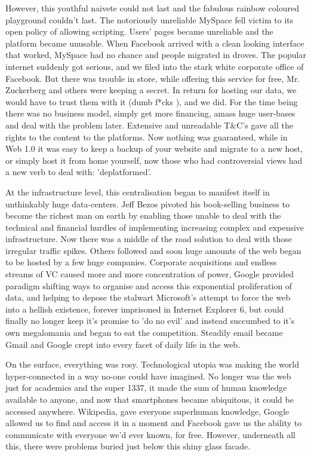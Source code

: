 However, this youthful naivete could not last and the fabulous rainbow coloured playground couldn't last. The notoriously unreliable MySpace fell victim to its open policy of allowing scripting. Users' pages became unreliable and the platform became unusable. When Facebook arrived with a clean looking interface that worked, MySpace had no chance and people migrated in droves. The popular internet suddenly got serious, and we filed into the stark white corporate office of Facebook. But there was trouble in store, while offering this service for free, Mr. Zuckerberg and others were keeping a secret. In return for hosting our data, we would have to trust them with it (dumb f*cks \cite{carlson2010ims}), and we did. For the time being there was no business model, simply get more financing, amass huge user-bases and deal with the problem later. Extensive and unreadable T\&C's gave all the rights to the content to the platforms. Now nothing was guaranteed, while in Web 1.0 it was easy to keep a backup of your website and migrate to a new host, or simply host it from home yourself, now those who had controversial views had a new verb to deal with: 'deplatformed'.

At the infrastructure level, this centralisation began to manifest itself in unthinkably huge data-centers. Jeff Bezos pivoted his book-selling business to become the richest man on earth by enabling those unable to deal with the technical and financial hurdles of implementing increasing complex and expensive infrastructure. Now there was a middle of the road solution to deal with those irregular traffic spikes. Others followed and soon huge amounts of the web began to be hosted by a few huge companies. Corporate acquisitions and endless streams of VC caused more and more concentration of power, Google provided paradigm shifting ways to organise and access this exponential proliferation of data, and helping to depose the stalwart Microsoft's attempt to force the web into a hellish existence, forever imprisoned in Internet Explorer 6, but could finally no longer keep it's promise to 'do no evil' and instead succumbed to it's own megalomania and began to eat the competition. Steadily email became Gmail and Google crept into every facet of daily life in the web.

On the surface, everything was rosy. Technological utopia was making the world hyper-connected in a way no-one could have imagined. No longer was the web just for academics and the super 1337, it made the sum of human knowledge available to anyone, and now that smartphones became ubiquitous, it could be accessed anywhere. Wikipedia, gave everyone superhuman knowledge, Google allowed us to find and access it in a moment and Facebook gave us the ability to communicate with everyone we'd ever known, for free. However, underneath all this, there were problems buried just below this shiny glass facade.

